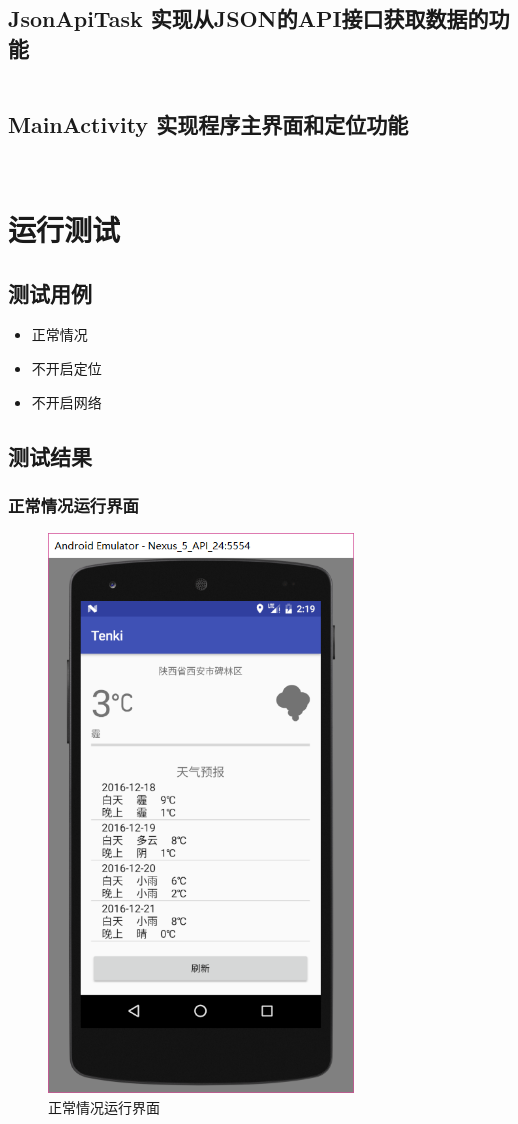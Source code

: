 \documentclass[UTF8]{ctexart}
\begin{document}
    \subsection{JsonApiTask 实现从JSON的API接口获取数据的功能}
      \inputminted{java}{../app/src/main/java/com/sylxjtu/prototype/JsonApiTask.java}
    \subsection{MainActivity 实现程序主界面和定位功能}
      \inputminted{java}{../app/src/main/java/com/sylxjtu/prototype/MainActivity.java}
      \inputminted{xml}{../app/src/main/res/layout/activity_main.xml}
  \section{运行测试}
    \subsection{测试用例}
      \begin{itemize}
        \item 正常情况
        \item 不开启定位
        \item 不开启网络
      \end{itemize}
    \subsection{测试结果}
      \subsubsection{正常情况运行界面}
        \begin{figure}[H]
          \caption{正常情况运行界面}
          \includegraphics[width=\textwidth, height=40em, keepaspectratio]{正常情况运行界面}
          \centering
        \end{figure}
\end{document}
